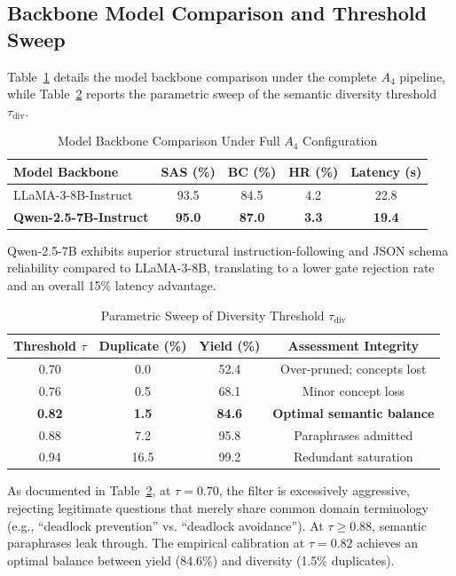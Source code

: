 \documentclass[conference]{IEEEtran}
\begin{document}
\subsection{Backbone Model Comparison and Threshold Sweep}
Table~\ref{tab:model_comp} details the model backbone comparison under the complete $A_4$ pipeline, while Table~\ref{tab:sweep} reports the parametric sweep of the semantic diversity threshold $\tau_{\text{div}}$.

\begin{table}[b]
\caption{Model Backbone Comparison Under Full $A_4$ Configuration}
\label{tab:model_comp}
\centering
\begin{tabular}{@{}lcccc@{}}
\toprule
\textbf{Model Backbone} & \textbf{SAS (\%)} & \textbf{BC (\%)} & \textbf{HR (\%)} & \textbf{Latency (s)} \\ \midrule
LLaMA-3-8B-Instruct & 93.5 & 84.5 & 4.2 & 22.8 \\
\textbf{Qwen-2.5-7B-Instruct} & \textbf{95.0} & \textbf{87.0} & \textbf{3.3} & \textbf{19.4} \\ \bottomrule
\end{tabular}
\end{table}

Qwen-2.5-7B exhibits superior structural instruction-following and JSON schema reliability compared to LLaMA-3-8B, translating to a lower gate rejection rate and an overall 15\% latency advantage.

\begin{table}[b]
\caption{Parametric Sweep of Diversity Threshold $\tau_{\text{div}}$}
\label{tab:sweep}
\centering
\begin{tabular}{@{}cccc@{}}
\toprule
\textbf{Threshold $\tau$} & \textbf{Duplicate (\%)} & \textbf{Yield (\%)} & \textbf{Assessment Integrity} \\ \midrule
0.70 & 0.0 & 52.4 & Over-pruned; concepts lost \\
0.76 & 0.5 & 68.1 & Minor concept loss \\
\textbf{0.82} & \textbf{1.5} & \textbf{84.6} & \textbf{Optimal semantic balance} \\
0.88 & 7.2 & 95.8 & Paraphrases admitted \\
0.94 & 16.5 & 99.2 & Redundant saturation \\ \bottomrule
\end{tabular}
\end{table}

As documented in Table~\ref{tab:sweep}, at $\tau = 0.70$, the filter is excessively aggressive, rejecting legitimate questions that merely share common domain terminology (e.g., ``deadlock prevention'' vs. ``deadlock avoidance''). At $\tau \ge 0.88$, semantic paraphrases leak through. The empirical calibration at $\tau = 0.82$ achieves an optimal balance between yield (84.6\%) and diversity (1.5\% duplicates).
\end{document}
